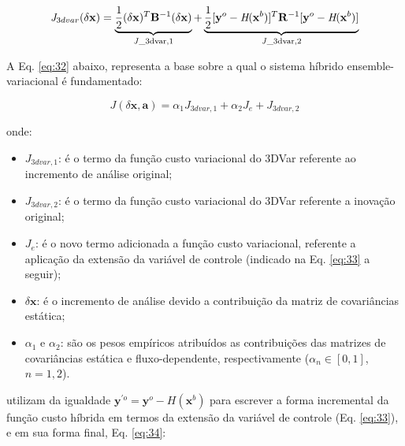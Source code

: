 \begin{equation}
\label{eq:31}
\textit{J}_{3dvar}(\delta\mathbf{x}) = \underbrace{\frac{1}{2} (\delta\mathbf{x})^{T}\mathbf{B}^{-1}(\delta\mathbf{x})}_{\text{\textit{J}\_{3dvar,1}}} + \underbrace{\frac{1}{2} [\mathbf{y}^{o} - \textit{H}(\mathbf{x}^{b})]^{T}\mathbf{R}^{-1}[\mathbf{y}^{o} - \textit{H}(\mathbf{x}^{b})] }_{\text{\textit{J}\_{3dvar,2}}}
\end{equation}

A Eq. \ref{eq:32} abaixo, representa a base sobre a qual o sistema híbrido ensemble-variacional é fundamentado:

\begin{equation}
\label{eq:32}
J(\delta\mathbf{x},\mathbf{a}) = \alpha_{1} J_{3dvar,1} + \alpha_{2} J_{e} + J_{3dvar,2}
\end{equation}

onde:

\begin{itemize}
\item $J_{3dvar,1}$: é o termo da função custo variacional do 3DVar referente ao incremento de análise original;
\item $J_{3dvar,2}$: é o termo da função custo variacional do 3DVar referente a inovação original;
\item $J_{e}$: é o novo termo adicionada a função custo variacional, referente a aplicação da extensão da variável de controle (indicado na Eq. \ref{eq:33} a seguir);
\item $\delta\mathbf{x}$: é o incremento de análise devido a contribuição da matriz de covariâncias estática;
\item $\alpha_{1}$ e $\alpha_{2}$: são os pesos empíricos atribuídos as contribuições das matrizes de covariâncias estática e fluxo-dependente, respectivamente ($\alpha_{n} \in [0,1]$, $n=1,2$).
\end{itemize}

 utilizam da igualdade ${\mathbf{y}}^{\prime{o}} = \mathbf{y}^{o} - \textit{H}(\mathbf{x}^{b})$ para escrever a forma incremental da função custo híbrida em termos da extensão da variável de controle (Eq. \ref{eq:33}), e em sua forma final, Eq. \ref{eq:34}:

